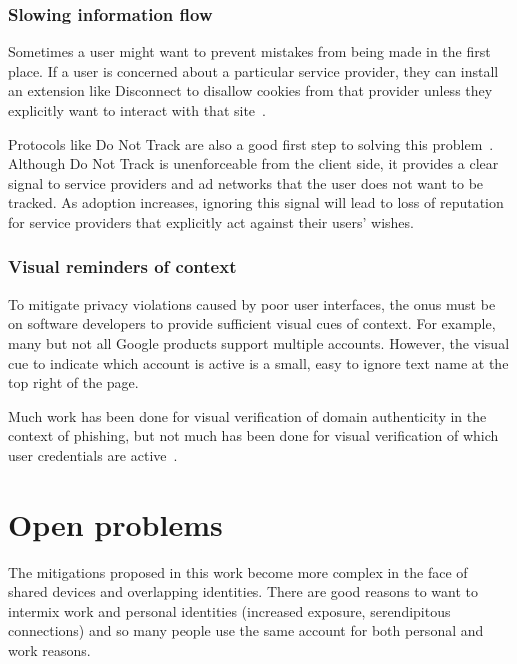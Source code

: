 \documentclass{llncs}
\begin{document}
\subsubsection{Slowing information flow}
Sometimes a user might want to prevent mistakes from being made in the first
place. If a user is concerned about a particular service provider, they can
install an extension like Disconnect to disallow cookies from that provider
unless they explicitly want to interact with that site~\cite{disconnect}.

Protocols like Do Not Track are also a good first step to solving this
problem~\cite{dnt}. Although Do Not Track is unenforceable from the client
side, it provides a clear signal to service providers and ad networks
that the user does not want to be tracked. As adoption increases, ignoring this
signal will lead to loss of reputation for service providers that explicitly
act against their users' wishes.

\subsubsection{Visual reminders of context}
To mitigate privacy violations caused by poor user interfaces, the onus must be
on software developers to provide sufficient visual cues of context. For
example, many but not all Google products support multiple accounts. However,
the visual cue to indicate which account is active is a small, easy to ignore
text name at the top right of the page.

Much work has been done for visual verification of domain authenticity in the
context of phishing, but not much has been done for visual verification of
which user credentials are active~\cite{skins}.

\begin{comment}
first party regrets, third party regrets
impossible to judge how big friends of friends
\end{comment}

\section{Open problems}
The mitigations proposed in this work become more complex in the face of shared
devices and overlapping identities. There are good reasons to want to intermix
work and personal identities (increased exposure, serendipitous connections)
and so many people use the same account for both personal and work reasons.
\end{document}
